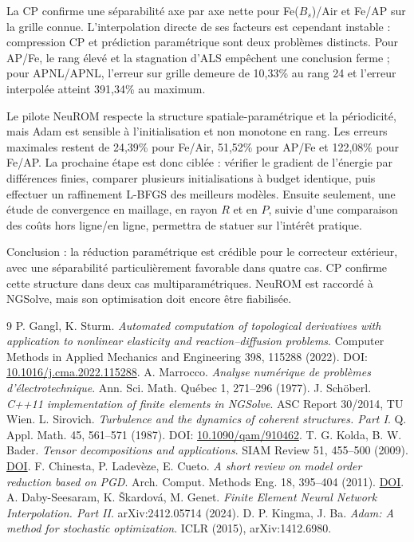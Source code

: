 \documentclass[10pt,a4paper]{article}
\newcommand{\resultbox}[1]{\begin{center}\colorbox{lightteal}{\parbox{.94\linewidth}{\small #1}}\end{center}}
\begin{document}
La CP confirme une séparabilité axe par axe nette pour Fe($B_s$)/Air et Fe/AP sur la grille connue. L'interpolation directe de ses facteurs est cependant instable : compression CP et prédiction paramétrique sont deux problèmes distincts. Pour AP/Fe, le rang élevé et la stagnation d'ALS empêchent une conclusion ferme ; pour APNL/APNL, l'erreur sur grille demeure de 10,33\% au rang 24 et l'erreur interpolée atteint 391,34\% au maximum.

Le pilote NeuROM respecte la structure spatiale-paramétrique et la périodicité, mais Adam est sensible à l'initialisation et non monotone en rang. Les erreurs maximales restent de 24,39\% pour Fe/Air, 51,52\% pour AP/Fe et 122,08\% pour Fe/AP. La prochaine étape est donc ciblée : vérifier le gradient de l'énergie par différences finies, comparer plusieurs initialisations à budget identique, puis effectuer un raffinement L-BFGS des meilleurs modèles. Ensuite seulement, une étude de convergence en maillage, en rayon $R$ et en $P$, suivie d'une comparaison des coûts hors ligne/en ligne, permettra de statuer sur l'intérêt pratique.

\resultbox{Conclusion : la réduction paramétrique est crédible pour le correcteur extérieur, avec une séparabilité particulièrement favorable dans quatre cas. CP confirme cette structure dans deux cas multiparamétriques. NeuROM est raccordé à NGSolve, mais son optimisation doit encore être fiabilisée.}

\newpage
\small
\sloppy
\begin{thebibliography}{9}
\setlength{\itemsep}{.05em}
 P. Gangl, K. Sturm. \emph{Automated computation of topological derivatives with application to nonlinear elasticity and reaction--diffusion problems}. Computer Methods in Applied Mechanics and Engineering 398, 115288 (2022). DOI: \href{https://doi.org/10.1016/j.cma.2022.115288}{10.1016/j.cma.2022.115288}.
 A. Marrocco. \emph{Analyse numérique de problèmes d'électrotechnique}. Ann. Sci. Math. Québec 1, 271--296 (1977).
 J. Schöberl. \emph{C++11 implementation of finite elements in NGSolve}. ASC Report 30/2014, TU Wien.
 L. Sirovich. \emph{Turbulence and the dynamics of coherent structures. Part I}. Q. Appl. Math. 45, 561--571 (1987). DOI: \href{https://doi.org/10.1090/qam/910462}{10.1090/qam/910462}.
 T. G. Kolda, B. W. Bader. \emph{Tensor decompositions and applications}. SIAM Review 51, 455--500 (2009). \href{https://doi.org/10.1137/07070111X}{DOI}.
 F. Chinesta, P. Ladevèze, E. Cueto. \emph{A short review on model order reduction based on PGD}. Arch. Comput. Methods Eng. 18, 395--404 (2011). \href{https://doi.org/10.1007/s11831-011-9064-7}{DOI}.
 A. Daby-Seesaram, K. \v{S}kardov\'a, M. Genet. \emph{Finite Element Neural Network Interpolation. Part II}. arXiv:2412.05714 (2024).
 D. P. Kingma, J. Ba. \emph{Adam: A method for stochastic optimization}. ICLR (2015), arXiv:1412.6980.
\end{thebibliography}
\fussy
\end{document}

